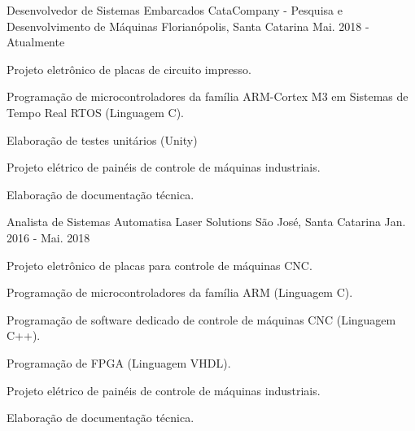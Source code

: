 

\begin{cventries}


  \cventry
    {Desenvolvedor de Sistemas Embarcados} %
    {CataCompany - Pesquisa e Desenvolvimento de Máquinas} %
    {Florianópolis, Santa Catarina} %
    {Mai. 2018 - Atualmente} %
    {
      \begin{cvitems} %
	\item {Projeto eletrônico de placas de circuito impresso.}	
        \item {Programação de microcontroladores da família ARM-Cortex M3 em Sistemas de Tempo Real RTOS (Linguagem C).}
        \item {Elaboração de testes unitários (Unity)}
	\item {Projeto elétrico de painéis de controle de máquinas industriais.}
        \item {Elaboração de documentação técnica.}
      \end{cvitems}
    }

  \cventry
    {Analista de Sistemas} %
    {Automatisa Laser Solutions} %
    {São José, Santa Catarina} %
    {Jan. 2016 - Mai. 2018} %
    {
      \begin{cvitems} %
	\item {Projeto eletrônico de placas para controle de máquinas CNC.}	
        \item {Programação de microcontroladores da família ARM (Linguagem C).}
        \item {Programação de software dedicado de controle de máquinas CNC (Linguagem C++).}
	\item {Programação de FPGA (Linguagem VHDL).}
	\item {Projeto elétrico de painéis de controle de máquinas industriais.}
        \item {Elaboração de documentação técnica.}
      \end{cvitems}
    }


\end{cventries}
